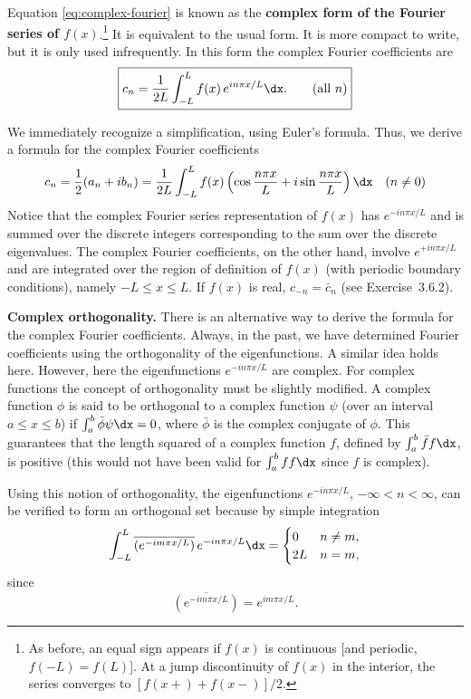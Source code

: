 Equation \eqref{eq:complex-fourier} is known as the \textbf{complex form of the Fourier series of $f(x)$}.\footnote{As before, an equal sign appears if $f(x)$ is continuous [and periodic, $f(-L) = f(L)$].  At a jump discontinuity of $f(x)$ in the interior, the series converges to $[f(x+) + f(x-)]/2$.}  It is equivalent to the usual form.  It is more compact to write, but it is only used infrequently.  In this form the complex Fourier coefficients are
\begin{equation}
\label{eq:cn-formula}
\boxed{c_n = \frac{1}{2L}\int_{-L}^{L} f(x)\,e^{in\pi x/L}\dx. \qquad \text{(all } n\text{)}}
\end{equation}

We immediately recognize a simplification, using Euler's formula.  Thus, we derive a formula for the complex Fourier coefficients
\[
c_n = \frac{1}{2}(a_n + ib_n) = \frac{1}{2L}\int_{-L}^{L} f(x)\left(\cos\frac{n\pi x}{L} + i\sin\frac{n\pi x}{L}\right)\dx \quad (n \ne 0)
\]
Notice that the complex Fourier series representation of $f(x)$ has $e^{-in\pi x/L}$ and is summed over the discrete integers corresponding to the sum over the discrete eigenvalues.  The complex Fourier coefficients, on the other hand, involve $e^{+in\pi x/L}$ and are integrated over the region of definition of $f(x)$ (with periodic boundary conditions), namely $-L \le x \le L$.  If $f(x)$ is real, $c_{-n} = \bar{c}_n$ (see Exercise~3.6.2).

\textbf{Complex orthogonality.}  There is an alternative way to derive the formula for the complex Fourier coefficients.  Always, in the past, we have determined Fourier coefficients using the orthogonality of the eigenfunctions.  A similar idea holds here.  However, here the eigenfunctions $e^{-in\pi x/L}$ are complex.  For complex functions the concept of orthogonality must be slightly modified.  A complex function $\phi$ is said to be orthogonal to a complex function $\psi$ (over an interval $a \le x \le b$) if $\int_a^b \bar{\phi}\psi \dx = 0$, where $\bar{\phi}$ is the complex conjugate of $\phi$.  This guarantees that the length squared of a complex function $f$, defined by $\int_a^b \bar{f}f \dx$, is positive (this would not have been valid for $\int_a^b ff \dx$ since $f$ is complex).

Using this notion of orthogonality, the eigenfunctions $e^{-in\pi x/L}$, $-\infty < n < \infty$, can be verified to form an orthogonal set because by simple integration
\[
\int_{-L}^{L} \overline{(e^{-im\pi x/L})}\,e^{-in\pi x/L}\dx = \begin{cases} 0 & n \ne m, \\ 2L & n = m, \end{cases}
\]
since
\[
\overline{(e^{-im\pi x/L})} = e^{im\pi x/L}.
\]

